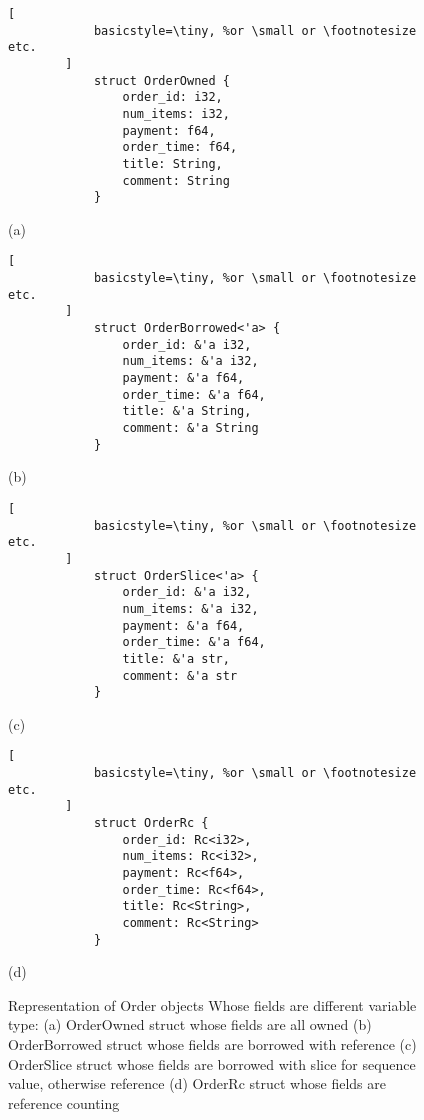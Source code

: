  \begin{figure}[htb]
    \begin{minipage}[t]{0.5\linewidth}\centering
        \begin{lstlisting}[
            basicstyle=\tiny, %or \small or \footnotesize etc.
        ]
            struct OrderOwned {
                order_id: i32,
                num_items: i32, 
                payment: f64,
                order_time: f64,
                title: String,
                comment: String
            } 
        \end{lstlisting}
      \medskip
      \centerline{(a)}
    \end{minipage}\hfill
    \begin{minipage}[t]{0.5\linewidth}\centering
        \begin{lstlisting}[
            basicstyle=\tiny, %or \small or \footnotesize etc.
        ]
            struct OrderBorrowed<'a> {
                order_id: &'a i32,
                num_items: &'a i32, 
                payment: &'a f64,
                order_time: &'a f64,
                title: &'a String,
                comment: &'a String
            }
        \end{lstlisting}
      \medskip
      \centerline{(b)}
    \end{minipage}
    \begin{minipage}[t]{0.5\linewidth}\centering
        \begin{lstlisting}[
            basicstyle=\tiny, %or \small or \footnotesize etc.
        ]
            struct OrderSlice<'a> {
                order_id: &'a i32,
                num_items: &'a i32, 
                payment: &'a f64,
                order_time: &'a f64,
                title: &'a str,
                comment: &'a str
            }
        \end{lstlisting}
      \medskip
      \centerline{(c)}
    \end{minipage}\hfill
    \begin{minipage}[t]{0.5\linewidth}\centering
        \begin{lstlisting}[
            basicstyle=\tiny, %or \small or \footnotesize etc.
        ]
            struct OrderRc {
                order_id: Rc<i32>,
                num_items: Rc<i32>,
                payment: Rc<f64>,
                order_time: Rc<f64>,
                title: Rc<String>,
                comment: Rc<String>
            }
        \end{lstlisting}
      \medskip
      \centerline{(d)}
    \end{minipage}\hfill
    \caption{Representation of Order objects Whose fields are different variable type: (a) OrderOwned struct whose fields are all owned 
    (b) OrderBorrowed struct whose fields are borrowed with reference (c) OrderSlice struct whose fields are borrowed with slice for sequence value, otherwise reference 
    (d) OrderRc struct whose fields are reference counting}
    \label{fig:order}
 \end{figure}

